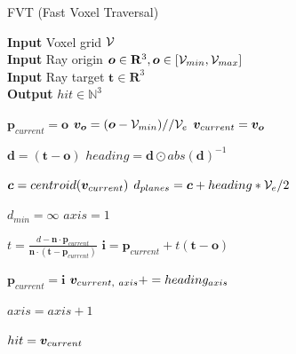 \begin{algorithm}
    \caption{FVT (Fast Voxel Traversal)}
    \hspace*{\algorithmicindent} \textbf{Input} Voxel grid \(\mathcal{V}\) \\
    \hspace*{\algorithmicindent} \textbf{Input} Ray origin \(\boldsymbol{o} \in \mathbf{R}^3, \boldsymbol{o} \in [\mathcal{V}_{min}, \mathcal{V}_{max}]\) \\
    \hspace*{\algorithmicindent} \textbf{Input} Ray target \(\boldsymbol{t} \in \mathbf{R}^3\) \\
    \hspace*{\algorithmicindent} \textbf{Output} $hit \in \mathbb{N}^{3}$  \\
    \begin{algorithmic}
    \label{algo:dda}

    \State $\boldsymbol{p}_{current} = \boldsymbol{o}$
    \State $\boldsymbol{v}_{\boldsymbol{o}} = (\boldsymbol{o} - \mathcal{V}_{min})//\mathcal{V}_{e}$
    \State $\boldsymbol{v}_{current} = \boldsymbol{v}_{\boldsymbol{o}}$

    \State $\boldsymbol{d} = (\boldsymbol{t} - \boldsymbol{o})$ 
    \State $heading = \boldsymbol{d} \odot abs(\boldsymbol{d})^{-1}$ 

        \State $\boldsymbol{c} = centroid(\boldsymbol{v}_{current})$
        \State $d_{planes} = \boldsymbol{c} + heading*\mathcal{V}_{e}/2$

        \State $d_{min} = \infty$
        \State $axis=1$

            \State $t = \frac{d - \boldsymbol{n} \cdot \boldsymbol{p}_{current}}{\boldsymbol{n} \cdot (\boldsymbol{t} - \boldsymbol{p}_{current})}$
            \State $\boldsymbol{i} = \boldsymbol{p}_{current} + t(\boldsymbol{t} - \boldsymbol{o})$

                \State $\boldsymbol{p}_{current} = \boldsymbol{i}$
                \State $\boldsymbol{v}_{current,\ axis} += heading_{axis}$
            \EndIf

            \State $axis=axis+1$
        \EndFor

    \State $hit = \boldsymbol{v}_{current}$
    \EndWhile

\end{algorithmic}
\end{algorithm}

